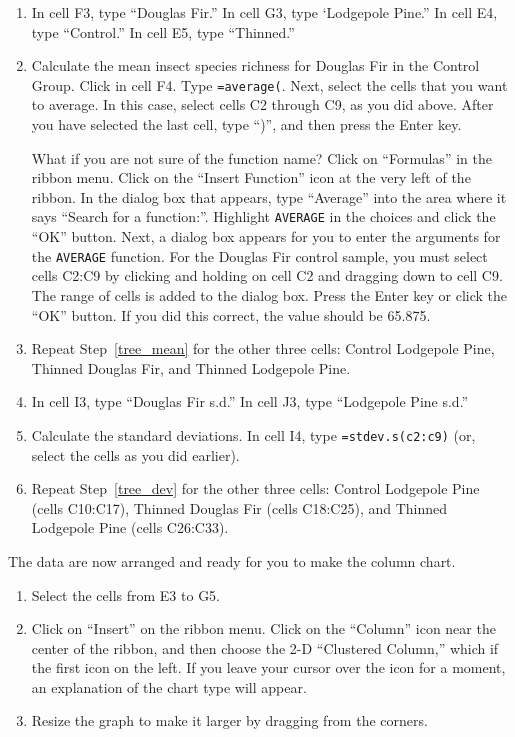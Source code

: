 \documentclass[12pt, hidelinks]{exam}
\begin{document}
\begin{enumerate}
	\item In cell F3, type “Douglas Fir.” In cell G3, type ‘Lodgepole Pine.” In cell E4, type “Control.” In cell E5, type “Thinned.” 

	\item \label{tree_mean} Calculate the mean insect species richness for Douglas Fir in the Control Group. Click in cell F4. Type \texttt{=average(}. Next, select the cells that you want to average. In this case, select cells C2 through C9, as you did above. After you have selected the last cell, type “)”, and then press the Enter key. 

What if you are not sure of the function name? Click on “Formulas” in the ribbon menu. Click on the “Insert Function” icon at the very left of the ribbon. In the dialog box that appears, type “Average” into the area where it says “Search for a function:”. Highlight \texttt{AVERAGE} in the choices and click the “OK” button. Next, a dialog box appears for you to enter the arguments for the \texttt{AVERAGE} function. For the Douglas Fir control sample, you must select cells C2:C9 by clicking and holding on cell C2 and dragging down to cell C9. The range of cells is added to the dialog box. Press the Enter key or click the “OK” button. If you did this correct, the value should be 65.875.

	\item Repeat Step~\ref{tree_mean} for the other three cells: Control Lodgepole Pine, Thinned Douglas Fir, and Thinned Lodgepole Pine. 
	
	\item \label{tree_dev} In cell I3, type ``Douglas Fir s.d.'' In cell J3, type ``Lodgepole Pine s.d.''
	
	\item Calculate the standard deviations. In cell I4, type \texttt{=stdev.s(c2:c9)} (or, select the cells as you did earlier).
	
	\item Repeat Step~\ref{tree_dev} for the other three cells: Control Lodgepole Pine (cells C10:C17), Thinned Douglas Fir (cells C18:C25), and Thinned Lodgepole Pine (cells C26:C33). 
	
\end{enumerate}



The data are now arranged and ready for you to make the column chart.

\begin{enumerate}[resume]
	\item Select the cells from E3 to G5.

	\item Click on “Insert” on the ribbon menu. Click on the “Column” icon near the center of the ribbon, and then choose the 2-D “Clustered Column,” which if the first icon on the left. If you leave your cursor over the icon for a moment, an explanation of the chart type will appear.

	\item Resize the graph to make it larger by dragging from the corners.
\end{enumerate}
\end{document}
